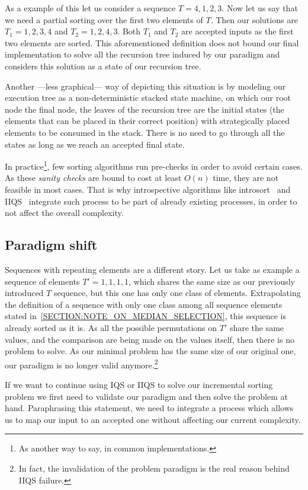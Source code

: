 As a example of this let us consider a sequence $T={4,1,2,3}$. Now let us say that we need a partial sorting over the first two elements of $T$. Then our solutions are $T_1={1,2,3,4}$ and $T_2={1,2,4,3}$. Both $T_1$ and $T_2$ are accepted inputs as the first two elements are sorted. This aforementioned definition does not bound our final implementation to solve all the recursion tree induced by our paradigm and considers this solution as a state of our recursion tree. 

Another ---less graphical--- way of depicting this situation is by modeling our execution tree as a non-deterministic stacked state machine, on which our root node the final node, the leaves of the recursion tree are the initial states (the elements that can be placed in their correct position) with strategically placed elements to be consumed in the stack. There is no need to go through all the states as long as we reach an accepted final state.


In practice\footnote{As another way to say, in common implementations.}, few sorting algorithms run pre-checks in order to avoid certain cases. As these \emph{sanity checks} are bound to cost at least $O(n)$ time, they are not feasible in most cases. That is why introspective algorithms like introsort~\cite{10.5555/261387.261395} and IIQS~\cite{7416566} integrate such process to be part of already existing processes, in order to not affect the overall complexity. 

\subsection{Paradigm shift}
Sequences with repeating elements are a different story. Let us take as example a sequence of elements $T'={1,1,1,1}$, which shares the same size as our previously introduced $T$ sequence, but this one has only one class of elements. Extrapolating the definition of a sequence with only one class among all sequence elements stated in~\ref{SECTION:NOTE_ON_MEDIAN_SELECTION}, this sequence is already sorted as it is. As all the possible permutations on $T'$ share the same values, and the comparison are being made on the values itself, then there is no problem to solve. As our minimal problem has the same size of our original one, our paradigm is no longer valid anymore.\footnote{In fact, the invalidation of the problem paradigm is the real reason behind IIQS failure.}

If we want to continue using IQS or IIQS to solve our incremental sorting problem we first need to validate our paradigm and then solve the problem at hand. Paraphrasing this statement, we need to integrate a process which allows us to map our input to an accepted one without affecting our current complexity.

